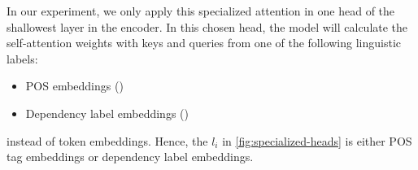In our experiment, we only apply this specialized attention in one head of the shallowest layer in the encoder. In this chosen head, the model will calculate the self-attention weights with keys and queries from one of the following linguistic labels:

\begin{itemize}
	\item POS embeddings (\SpecPOS)
    \item Dependency label embeddings (\SpecDep)
\end{itemize}

instead of token embeddings. Hence, the $l_i$ in \cref{fig:specialized-heads} is either POS tag embeddings or dependency label embeddings.
